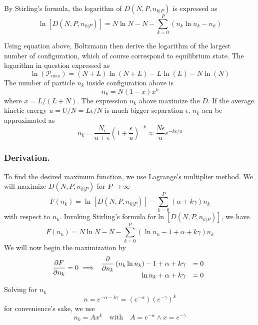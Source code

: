 \documentclass[../../../Main.tex]{subfiles}
\begin{document}
By Stirling’s formula, the logarithm of $D(N , P, n_{k|P} )$ is expressed as
\begin{equation*}
    \ln\left[D(N , P, n_{k|P} )\right]=N\ln N-N-\sum_{k=0}^{P}\left(n_k\ln n_k-n_k\right)
\end{equation*}

Using equation above, Boltzmann then derive the logarithm of the largest number of configuration, which of course correspond to equilibrium state. The logarithm in question expressed as 
\begin{equation*}
    \ln(\mathcal{P}_\text{max})= (N+L)\ln (N+L) - L\ln (L)-N\ln (N)
\end{equation*}
The number of particle $n_k$ inside configuration above is 
\begin{equation*}
    n_k=N(1-x)x^k
\end{equation*}
where $x=L/(L+N)$. The expression $n_k$ above maximize the $D$. If the average kinetic energy $u=U/N=L\epsilon/N$ is much bigger separation $\epsilon$, $n_k$ acn be approximated as 
\begin{equation*}
    n_k=\frac{N_\epsilon}{u+\epsilon}\left(1+\frac{\epsilon}{u}\right)^{-k}\approx\frac{N\epsilon}{u}e^{-k\epsilon/u}
\end{equation*}

\subsubsection*{Derivation.} To find the desired maximum function, we use Lagrange's multiplier method. We will maximize $D(N , P, n_{k|P})$ for $P\rightarrow\infty$
\begin{equation*}
    F(n_k)=\ln\left[D(N , P, n_{k|P} )\right]- \sum_{k=0}^{P}(\alpha + k\gamma )n_k
\end{equation*}
with respect to $n_k$. Invoking Stirling's formula for$\ln\left[D(N , P, n_{k|P} )\right]$, we have
\begin{equation*}
    F(n_k)=N\ln N-N-\sum_{k=0}^{P}(\ln n_k -1 +\alpha + k\gamma )n_k
\end{equation*}
We will now begin the maximization by
\begin{equation*}
    \frac{\partial F}{\partial n_k}=0\implies\begin{array}{r l}
        \dfrac{\partial }{\partial n_k}\left(n_k\ln n_k\right)-1+ \alpha +k\gamma&=0\\
        \ln n_k+\alpha +k\gamma&=0
    \end{array}
\end{equation*}
Solving for $n_k$
\begin{equation*}
    n=e^{-\alpha-k\gamma}=\left(e^{-\alpha}\right)\left(e^{-\gamma}\right)^k
\end{equation*}
for convenience’s sake, we use 
\begin{equation*}
    n_k=Ax^k\quad \text{with}\quad A=e^{-\alpha}\land x=e^{-\gamma}
\end{equation*}
\end{document}
